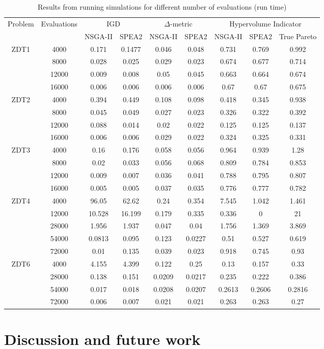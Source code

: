\documentclass[sigconf,nonacm]{acmart}
\begin{document}
\begin{table}
    \centering
    \begin{tabular}{|c|c|c|c|c|c|c|c|c|}
    \hline
         \multirow{2}{3em}{Problem} & \multirow{2}{4.5em}{Evaluations} & \multicolumn{2}{|c|}{IGD} & \multicolumn{2}{|c|}{$\Delta$-metric} & \multicolumn{3}{|c|}{Hypervolume Indicator} \\
         & & NSGA-II & SPEA2 & NSGA-II & SPEA2 & NSGA-II & SPEA2 & True Pareto \\
         \hline
         \multirow{4}{3em}{ZDT1} & 4000 & 0.171 & 0.1477 & 0.046 & 0.048 & 0.731 & 0.769 & 0.992 \\
         & 8000 & 0.028 & 0.025 & 0.029 & 0.023 & 0.674 & 0.677 & 0.714 \\
         & 12000 & 0.009 & 0.008 & 0.05 & 0.045 & 0.663 & 0.664 & 0.674 \\
         & 16000 & 0.006 & 0.006 & 0.006 & 0.006 & 0.67 & 0.67 & 0.675 \\
         \hline
         \multirow{4}{3em}{ZDT2} & 4000 & 0.394 & 0.449 & 0.108 & 0.098 & 0.418 & 0.345 & 0.938 \\
         & 8000 & 0.045 & 0.049 & 0.027 & 0.023 & 0.326 & 0.322 & 0.392 \\
         & 12000 & 0.088 & 0.014 & 0.02 & 0.022 & 0.125 & 0.125 & 0.137 \\
         & 16000 & 0.006 & 0.006 & 0.029 & 0.022 & 0.324 & 0.325 & 0.331 \\
         \hline
         \multirow{4}{3em}{ZDT3} & 4000 & 0.16 & 0.176 & 0.058 & 0.056 & 0.964 & 0.939 & 1.28 \\
         & 8000 & 0.02 & 0.033 & 0.056 & 0.068 & 0.809 & 0.784 & 0.853 \\
         & 12000 & 0.009 & 0.007 & 0.036 & 0.041 & 0.788 & 0.795 & 0.807 \\
         & 16000 & 0.005 & 0.005 & 0.037 & 0.035 & 0.776 & 0.777 & 0.782 \\
         \hline
         \multirow{5}{3em}{ZDT4} & 4000 & 96.05 & 62.62 & 0.24 & 0.354 & 7.545 & 1.042 & 1.461 \\
         & 12000 & 10.528 & 16.199 & 0.179 & 0.335 & 0.336 & 0 & 21 \\
         & 28000 & 1.956 & 1.937 & 0.047 & 0.04 & 1.756 & 1.369 & 3.869 \\
         & 54000 & 0.0813 & 0.095 & 0.123 & 0.0227 & 0.51 & 0.527 & 0.619 \\
         & 72000 & 0.01 & 0.135 & 0.039 & 0.023 & 0.918 & 0.745 & 0.93 \\
         \hline
         \multirow{4}{3em}{ZDT6} & 4000 & 4.155 & 4.399 & 0.122 & 0.25 & 0.13 & 0.157 & 0.33 \\
         & 28000 & 0.138 & 0.151 & 0.0209 & 0.0217 & 0.235 & 0.222 & 0.386 \\
         & 54000 & 0.017 & 0.018 & 0.0208 & 0.0207 & 0.2613 & 0.2606 & 0.2816 \\
         & 72000 & 0.006 & 0.007 & 0.021 & 0.021 & 0.263 & 0.263 & 0.27 \\
         \hline
    \end{tabular}
    \caption{Results from running simulations for different number of evaluations (run time)}
\end{table}

\section{Discussion and future work}


 
\end{document}
